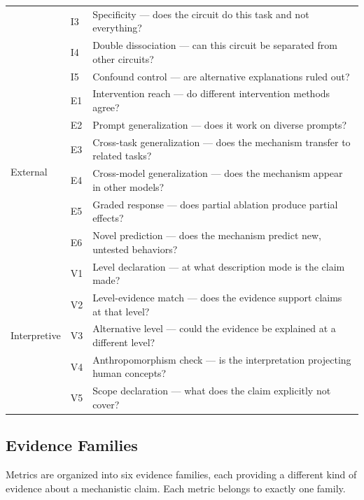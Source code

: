 \documentclass[10pt]{article}
\begin{document}
\begin{table}[t]
\begin{tabular}{@{}llp{6.5cm}@{}}
& I3 & Specificity --- does the circuit do this task and not everything? \\
& I4 & Double dissociation --- can this circuit be separated from other circuits? \\
& I5 & Confound control --- are alternative explanations ruled out? \\
\midrule
\multirow{6}{*}{External} & E1 & Intervention reach --- do different intervention methods agree? \\
& E2 & Prompt generalization --- does it work on diverse prompts? \\
& E3 & Cross-task generalization --- does the mechanism transfer to related tasks? \\
& E4 & Cross-model generalization --- does the mechanism appear in other models? \\
& E5 & Graded response --- does partial ablation produce partial effects? \\
& E6 & Novel prediction --- does the mechanism predict new, untested behaviors? \\
\midrule
\multirow{5}{*}{Interpretive} & V1 & Level declaration --- at what description mode is the claim made? \\
& V2 & Level-evidence match --- does the evidence support claims at that level? \\
& V3 & Alternative level --- could the evidence be explained at a different level? \\
& V4 & Anthropomorphism check --- is the interpretation projecting human concepts? \\
& V5 & Scope declaration --- what does the claim explicitly not cover? \\
\bottomrule
\end{tabular}
\end{table}

\subsection{Evidence Families}
\label{sec:evidence-families}

Metrics are organized into six evidence families, each providing a different kind of evidence about a mechanistic claim. Each metric belongs to exactly one family.
\end{document}
